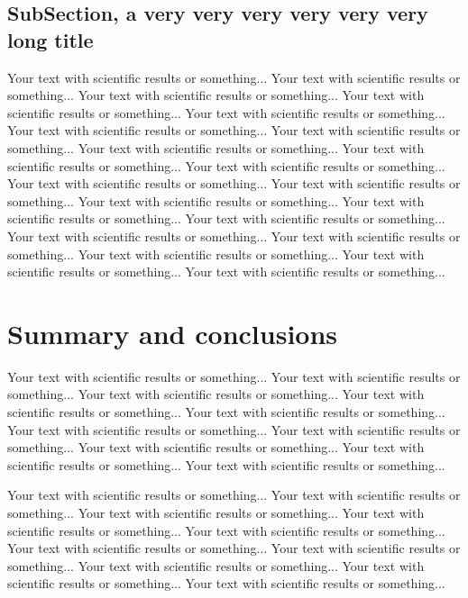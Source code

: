 \documentclass[final]{beamer}
\begin{document}
\begin{frame}[t]
\begin{multicols}{3}
\subsection{SubSection, a very very very very very very long title}

Your text with scientific results or something...
Your text with scientific results or something...
Your text with scientific results or something...
Your text with scientific results or something...
Your text with scientific results or something...
Your text with scientific results or something...
Your text with scientific results or something...
Your text with scientific results or something...
Your text with scientific results or something...
Your text with scientific results or something...
Your text with scientific results or something...
Your text with scientific results or something...
Your text with scientific results or something...
Your text with scientific results or something...
Your text with scientific results or something...
Your text with scientific results or something...
Your text with scientific results or something...
Your text with scientific results or something...
Your text with scientific results or something...
Your text with scientific results or something...

\section{Summary and conclusions}

Your text with scientific results or something...
Your text with scientific results or something...
Your text with scientific results or something...
Your text with scientific results or something...
Your text with scientific results or something...
Your text with scientific results or something...
Your text with scientific results or something...
Your text with scientific results or something...
Your text with scientific results or something...
Your text with scientific results or something...

Your text with scientific results or something...
Your text with scientific results or something...
Your text with scientific results or something...
Your text with scientific results or something...
Your text with scientific results or something...
Your text with scientific results or something...
Your text with scientific results or something...
Your text with scientific results or something...
Your text with scientific results or something...
Your text with scientific results or something...



\end{multicols}
\end{frame}
\end{document}
